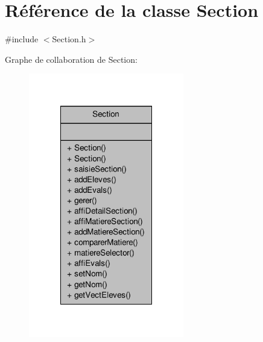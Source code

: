 \hypertarget{class_section}{\section{Référence de la classe Section}
\label{class_section}
}


{\ttfamily \#include $<$Section.\-h$>$}



Graphe de collaboration de Section\-:
\nopagebreak
\begin{figure}[H]
\begin{center}
\leavevmode
\includegraphics[width=192pt]{class_section__coll__graph}
\end{center}
\end{figure}
